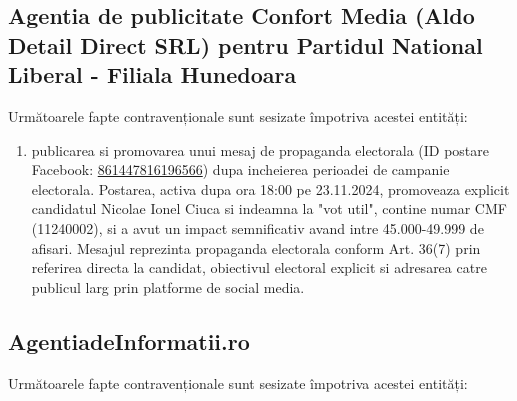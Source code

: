 \documentclass[a4paper,12pt]{article}
\begin{document}
\vspace{0.5cm}

\subsection{Agentia de publicitate Confort Media (Aldo Detail Direct SRL) pentru Partidul National Liberal - Filiala Hunedoara}
Următoarele fapte contravenționale sunt sesizate împotriva acestei entități:

\begin{enumerate}[leftmargin=*, label=\arabic*.)]
    \item publicarea si promovarea unui mesaj de propaganda electorala (ID postare Facebook: \href{https://www.facebook.com/ads/library/?id=861447816196566}{861447816196566}) dupa incheierea perioadei de campanie electorala. Postarea, activa dupa ora 18:00 pe 23.11.2024, promoveaza explicit candidatul Nicolae Ionel Ciuca si indeamna la "vot util", contine numar CMF (11240002), si a avut un impact semnificativ avand intre 45.000-49.999 de afisari. Mesajul reprezinta propaganda electorala conform Art. 36(7) prin referirea directa la candidat, obiectivul electoral explicit si adresarea catre publicul larg prin platforme de social media.
\end{enumerate}

\vspace{0.5cm}

\subsection{AgentiadeInformatii.ro}
Următoarele fapte contravenționale sunt sesizate împotriva acestei entități:
\end{document}
